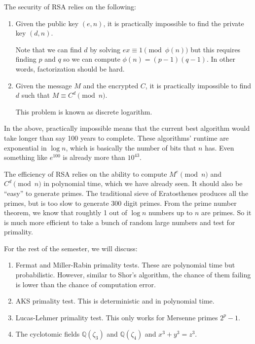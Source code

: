 \documentclass{article}
\def\Q{{\mathbb Q}}
\def\Q{{\mathbb Q}}
\begin{document}
\vspace{5pt}
The security of RSA relies on the following:
\begin{enumerate}
    \item Given the public key $(e,n)$, it is practically impossible to find the private key $(d,n)$.

    Note that we can find $d$ by solving $ex\equiv 1\pmod{\phi(n)}$ but this requires finding $p$ and $q$ so we can compute $\phi(n) = (p-1)(q-1)$. In other words, factorization should be hard.
    \item Given the message $M$ and the encrypted $C$, it is practically impossible to find $d$ such that $M\equiv C^d\pmod{n}$.

    This problem is known as discrete logarithm.
\end{enumerate}
In the above, practically impossible means that the current best algorithm would take longer than say 100 years to complete. These algorithms' runtime are exponential in $\log n$, which is basically the number of bits that $n$ has. Even something like $e^{100}$ is already more than $10^{43}$.

\vspace{5pt}
The efficiency of RSA relies on the ability to compute $M^e\pmod{n}$ and $C^d\pmod{n}$ in polynomial time, which we have already seen. It should also be ``easy'' to generate primes. The traditional sieve of Eratosthenes produces all the primes, but is too slow to generate $300$ digit primes. From the prime number theorem, we know that roughtly 1 out of $\log n$ numbers up to $n$ are primes. So it is much more efficient to take a bunch of random large numbers and test for primality.

For the rest of the semester, we will discuss:
\begin{enumerate}
    \item Fermat and Miller-Rabin primality tests. These are polynomial time but probabilistic. However, similar to Shor's algorithm, the chance of them failing is lower than the chance of computation error.
    \item AKS primality test. This is deterministic and in polynomial time. 
    \item Lucas-Lehmer primality test. This only works for Mersenne primes $2^p - 1$.
    \item The cyclotomic fields $\Q(\zeta_3)$ and $\Q(\zeta_4)$ and $x^3 + y^3 = z^3$.
\end{enumerate}
\end{document}
